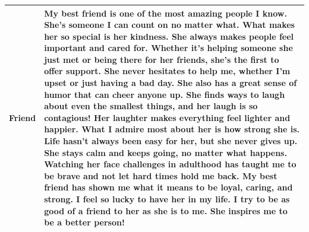 \documentclass[
  man,
  floatsintext,
  longtable,
  nolmodern,
  notxfonts,
  notimes,
  colorlinks=true,linkcolor=blue,citecolor=blue,urlcolor=blue]{apa7}
\begin{document}
\begin{supptbl}[H]
\begin{minipage}{\linewidth}
\begin{tabular}{>{\raggedright\arraybackslash}p{2cm}>{\raggedright\arraybackslash}p{14cm}}
Friend & My best friend is one of the most amazing people I know. She's someone I can count on no matter what. What makes her so special is her kindness. She always makes people feel important and cared for. Whether it's helping someone she just met or being there for her friends, she's the first to offer support. She never hesitates to help me, whether I'm upset or just having a bad day. She also has a great sense of humor that can cheer anyone up. She finds ways to laugh about even the smallest things, and her laugh is so contagious! Her laughter makes everything feel lighter and happier. What I admire most about her is how strong she is. Life hasn't always been easy for her, but she never gives up. She stays calm and keeps going, no matter what happens. Watching her face challenges in adulthood has taught me to be brave and not let hard times hold me back. My best friend has shown me what it means to be loyal, caring, and strong. I feel so lucky to have her in my life. I try to be as good of a friend to her as she is to me. She inspires me to be a better person!\\
\bottomrule
\end{tabular}
\endgroup{}
\endgroup

\end{minipage}%

\end{supptbl}%

\newpage
\end{document}
